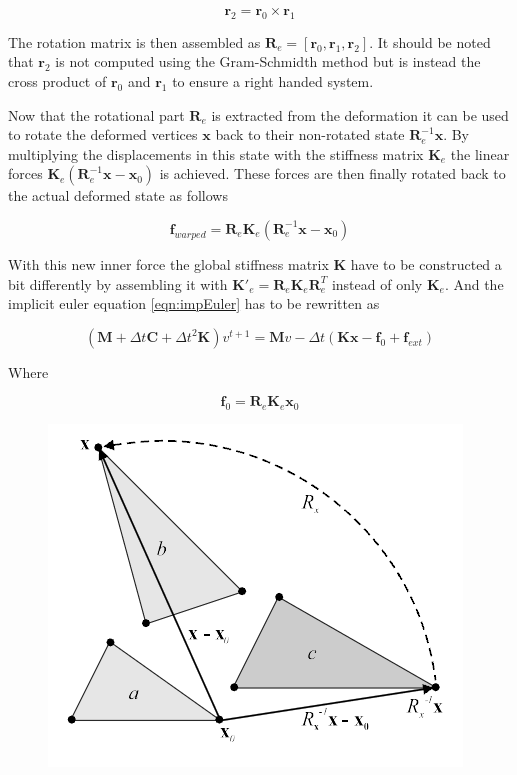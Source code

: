 \begin{equation}\label{eqn:r2}
    \mathbf{r}_2 =  \mathbf{r}_0 \times  \mathbf{r}_1
\end{equation}

The rotation matrix is then assembled as $\mathbf{R}_e =[ \mathbf{r}_0 ,  \mathbf{r}_1 ,  \mathbf{r}_2]$. It should be noted that $\mathbf{r}_2$ is not computed using the Gram-Schmidth method but is instead the cross product of $\mathbf{r}_0$ and  $\mathbf{r}_1$ to ensure a right handed system.

Now that the rotational part $\mathbf{R}_e$ is extracted from the deformation it can be used to rotate the deformed vertices $\mathbf{x}$ back to their non-rotated state $\mathbf{R}_e^{-1} \mathbf{x}$. By multiplying the displacements in this state with the stiffness matrix $\mathbf{K}_e$ the linear forces $\mathbf{K}_e (\mathbf{R}_e^{-1} \mathbf{x} - \mathbf{x}_0)$ is achieved. These forces are then finally rotated back to the actual deformed state as follows

\begin{equation}\label{eqn:f_warped}
     \mathbf{f}_{warped} = \mathbf{R}_e \mathbf{K}_e (\mathbf{R}_e^{-1} \mathbf{x} - \mathbf{x}_0)
\end{equation}

With this new inner force the global stiffness matrix $\mathbf{K}$ have to be constructed a bit differently by assembling it with $\mathbf{K}'_e = \mathbf{R}_e \mathbf{K}_e \mathbf{R}_e^T$ instead of only $\mathbf{K}_e$. And the implicit euler equation \ref{eqn:impEuler} has to be rewritten as

\begin{equation}\label{eqn:warpedImpEuler}
		(\mathbf{M} + \Delta t  \mathbf{C} + \Delta t^2 \mathbf{K})v^{t+1} = \mathbf{M} v - \Delta t (\mathbf{Kx}-\mathbf{f}_0 + \mathbf{f}_{ext})
\end{equation}

Where 

\begin{equation}\label{eqn:f0}
		\mathbf{f}_0 = \mathbf{R}_e \mathbf{K}_e \mathbf{x}_0
\end{equation}



\begin{figure}[h]
\centering
\includegraphics[width=.5\columnwidth]{figures/warpedstiffness.png}
\caption{}
\label{fig:4}
\end{figure}